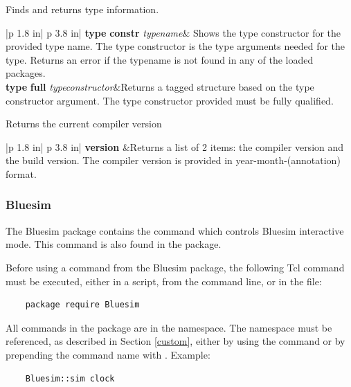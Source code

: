 
 Finds and returns type information.

\begin{tabular}{|p {1.8 in}| p {3.8 in}|}
\hline
\hline
{\bf type} {\bf  constr} {\em typename}& Shows the type constructor for
the provided type name. The type constructor is the type arguments
needed for the type. Returns an error if the typename is not found in
any of the loaded packages. \\ 
\hline
{\bf type} {\bf full} {\em typeconstructor}&Returns a tagged structure
based on the type constructor argument. The type constructor provided
must be fully qualified. \\
\hline
\hline
\end{tabular}



Returns the current compiler version

\begin{tabular}{|p {1.8 in}| p {3.8 in}|}
\hline
\hline
{\bf version} &Returns a list of 2 items: the compiler version
and the build  version. The compiler version is
provided  in year-month-(annotation) format. \\
\hline
\hline
\end{tabular}


\subsubsection{Bluesim}

The Bluesim package contains the  command which controls
Bluesim interactive mode.  This command is also found in the
 package.

Before using a command from the Bluesim package,  the
following Tcl command must  be executed, either in a script, 
from the command line, or in the  file:
\begin{verbatim}
    package require Bluesim
\end{verbatim}

All commands in the  package are in the  
namespace.  The namespace must be referenced, as described in Section
\ref{custom}, either by using the  command or by
prepending the command name with .  Example:
\begin{verbatim}
    Bluesim::sim clock
\end{verbatim}

